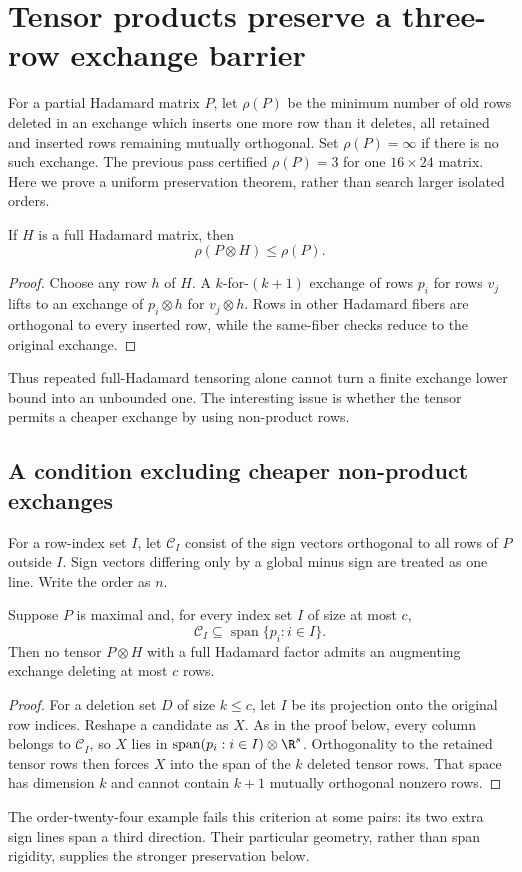 \section{Tensor products preserve a three-row exchange barrier}
For a partial Hadamard matrix $P$, let $\rho(P)$ be the minimum number
of old rows deleted in an exchange which inserts one more row than it
deletes, all retained and inserted rows remaining mutually orthogonal.
Set $\rho(P)=\infty$ if there is no such exchange. The previous pass
certified $\rho(P)=3$ for one $16\times24$ matrix. Here we prove a
uniform preservation theorem, rather than search larger isolated orders.


\begin{proposition}
If $H$ is a full Hadamard matrix, then
\[
 \rho(P\otimes H)\le\rho(P).
\]
\end{proposition}
\begin{proof}
Choose any row $h$ of $H$. A $k$-for-$(k+1)$ exchange of rows $p_i$
for rows $v_j$ lifts to an exchange of $p_i\otimes h$ for $v_j\otimes h$.
Rows in other Hadamard fibers are orthogonal to every inserted row,
while the same-fiber checks reduce to the original exchange.
\end{proof}
Thus repeated full-Hadamard tensoring alone cannot turn a finite
exchange lower bound into an unbounded one. The interesting issue is
whether the tensor permits a cheaper exchange by using non-product rows.

\subsection{A condition excluding cheaper non-product exchanges}
For a row-index set $I$, let $\mathcal C_I$ consist of the sign vectors
orthogonal to all rows of $P$ outside $I$. Sign vectors differing only
by a global minus sign are treated as one line. Write the order as $n$.

\begin{proposition}
Suppose $P$ is maximal and, for every index set $I$ of size at most $c$,
\[
 \mathcal C_I\subseteq\operatorname{span}\{p_i:i\in I\}.
\]
Then no tensor $P\otimes H$ with a full Hadamard factor admits an
augmenting exchange deleting at most $c$ rows.
\end{proposition}
\begin{proof}
For a deletion set $D$ of size $k\le c$, let $I$ be its projection
onto the original row indices. Reshape a candidate as $X$. As in the
proof below, every column belongs to $\mathcal C_I$, so $X$ lies in
$\operatorname{span}(p_i:i\in I)\otimes\R^s$. Orthogonality to the
retained tensor rows then forces $X$ into the span of the $k$ deleted
tensor rows. That space has dimension $k$ and cannot contain $k+1$
mutually orthogonal nonzero rows.
\end{proof}
The order-twenty-four example fails this criterion at some pairs: its
two extra sign lines span a third direction. Their particular geometry,
rather than span rigidity, supplies the stronger preservation below.

